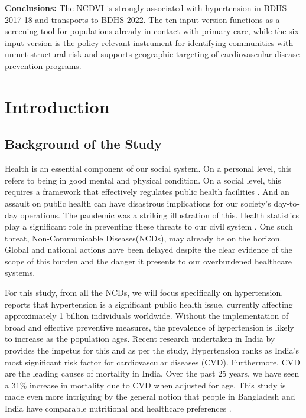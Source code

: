 \documentclass[
  12pt,
  a4paper]{article}
\begin{document}
\textbf{Conclusions:} The NCDVI is strongly associated with hypertension in BDHS 2017-18 and transports to BDHS 2022. The ten-input version functions as a screening tool for populations already in contact with primary care, while the six-input version is the policy-relevant instrument for identifying communities with unmet structural risk and supports geographic targeting of cardiovascular-disease prevention programs.

\newpage

\section{Introduction}\label{introduction}

\subsection{Background of the Study}\label{background-of-the-study}

Health is an essential component of our social system. On a personal level, this refers to being in good mental and physical condition. On a social level, this requires a framework that effectively regulates public health facilities \citep{rothstein2002rethinking}. And an assault on public health can have disastrous implications for our society's day-to-day operations. The pandemic was a striking illustration of this. Health statistics play a significant role in preventing these threats to our civil system \citep{coccia2021pandemic}. One such threat, Non-Communicable Diseases(NCDs), may already be on the horizon. Global and national actions have been delayed despite the clear evidence of the scope of this burden and the danger it presents to our overburdened healthcare systems\citep{meetoo_chronic_2008}.

For this study, from all the NCDs, we will focus specifically on hypertension. \citet{chobanian2003seventh} reports that hypertension is a significant public health issue, currently affecting approximately 1 billion individuals worldwide. Without the implementation of broad and effective preventive measures, the prevalence of hypertension is likely to increase as the population ages. Recent research undertaken in India by \citet{gupta_hypertension_2018} provides the impetus for this and as per the study, Hypertension ranks as India's most significant risk factor for cardiovascular diseases (CVD). Furthermore, CVD are the leading causes of mortality in India. Over the past 25 years, we have seen a 31\% increase in mortality due to CVD when adjusted for age. This study is made even more intriguing by the general notion that people in Bangladesh and India have comparable nutritional and healthcare preferences \citep{rahman2017epidemiological}.
\end{document}
